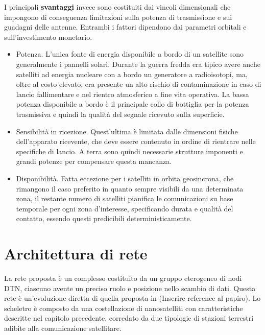 \documentclass[12pt,a4paper,oneside]{book}
\begin{document}
			I principali {\bf svantaggi} invece sono costituiti dai vincoli dimensionali che impongono di conseguenza limitazioni sulla potenza di trasmissione e sui guadagni delle antenne.	Entrambi i fattori dipendono dai parametri orbitali e sull'investimento monetario. 
			\begin{itemize}
				\item Potenza. L'unica fonte di energia disponibile a bordo di un satellite sono generalmente i pannelli solari. Durante la guerra fredda era tipico avere anche satelliti ad energia nucleare con a bordo un generatore a radioisotopi, ma, oltre al costo elevato, era presente un alto rischio di contaminazione in caso di lancio fallimentare e nel rientro atmosferico a fine vita operativa.
				La bassa potenza disponibile a bordo è il principale collo di bottiglia per la potenza trasmissiva e quindi la qualità del segnale ricevuto sulla superficie. 
				\item Sensibilità in ricezione. Quest'ultima è limitata dalle dimensioni fisiche dell'apparato ricevente, che deve essere contenuto in ordine di rientrare nelle specifiche di lancio. A terra sono quindi necessarie strutture imponenti e grandi potenze per compensare questa mancanza. 
				\item Disponibilità. Fatta eccezione per i satelliti in orbita geosincrona, che rimangono il caso preferito in quanto sempre visibili da una determinata zona, il restante numero di satelliti pianifica le comunicazioni su base temporale per ogni zona d'interesse, specificando durata e qualità del contatto, essendo questi predicibili deterministicamente.
				 
			\end{itemize}
			
			
		
		\section{Architettura di rete}	
		
		La rete proposta è un complesso costituito da un gruppo eterogeneo di nodi DTN, ciascuno avente un preciso ruolo e posizione nello scambio di dati. Questa rete è un'evoluzione diretta di quella proposta in (Inserire reference al papiro). Lo scheletro è composto da una costellazione di nanosatelliti con caratteristiche descritte nel capitolo precedente, corredato da due tipologie di stazioni terrestri adibite alla comunicazione satellitare. 
		
\end{document}
